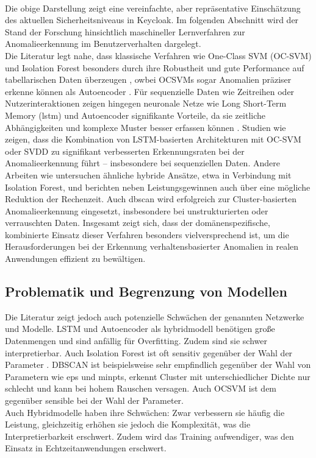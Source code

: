 \documentclass[a4paper,12pt]{article}
\let\footnote=\endnote
\begin{document}
	\\[0.5em]
	Die obige Darstellung zeigt eine vereinfachte, aber repräsentative Einschätzung des aktuellen Sicherheitsniveaus in Keycloak. Im folgenden Abschnitt wird der Stand der Forschung hinsichtlich maschineller Lernverfahren zur Anomalieerkennung im Benutzerverhalten dargelegt.
	\\[0.5em]
	Die Literatur legt nahe, dass klassische Verfahren wie One-Class SVM (OC-SVM) und Isolation Forest besonders durch ihre Robustheit und gute Performance auf tabellarischen Daten überzeugen \cite{pang2021deep}, owbei OCSVMs sogar Anomalien präziser erkenne können als Autoencoder \cite{arjunan2024}. Für sequenzielle Daten wie Zeitreihen oder Nutzerinteraktionen zeigen hingegen neuronale Netze wie Long Short-Term Memory (\gls{lstm}) und Autoencoder signifikante Vorteile, da sie zeitliche Abhängigkeiten und komplexe Muster besser erfassen können \cite{demir2024comparative}. Studien wie \cite{ergen2017unsupervised} zeigen, dass die Kombination von LSTM-basierten Architekturen mit OC-SVM oder SVDD \footnote{https://github.com/lukasruff/Deep-SVDD-PyTorch} zu signifikant verbesserten Erkennungsraten bei der Anomalieerkennung führt – insbesondere bei sequenziellen Daten. Andere Arbeiten wie \cite{ghrib2020hybrid} untersuchen ähnliche hybride Ansätze, etwa in Verbindung mit Isolation Forest, und berichten neben Leistungsgewinnen auch über eine mögliche Reduktion der Rechenzeit. Auch \gls{dbscan} wird erfolgreich zur Cluster-basierten Anomalieerkennung eingesetzt, insbesondere bei unstrukturierten oder verrauschten Daten. Insgesamt zeigt sich, dass der domänenspezifische, kombinierte Einsatz dieser Verfahren besonders vielversprechend ist, um die Herausforderungen bei der Erkennung verhaltensbasierter Anomalien in realen Anwendungen effizient zu bewältigen.
	
	\subsection{Problematik und Begrenzung von Modellen}
	Die Literatur zeigt jedoch auch potenzielle Schwächen der genannten Netzwerke und Modelle. LSTM und Autoencoder als \gls{hybridmodell} benötigen große Datenmengen und sind anfällig für Overfitting. Zudem sind sie schwer interpretierbar. Auch Isolation Forest ist oft sensitiv gegenüber der Wahl der Parameter \cite{chua2024web}. DBSCAN ist beispielsweise sehr empfindlich gegenüber der Wahl von Parametern wie \gls{eps} und \gls{minpts}, erkennt Cluster mit unterschiedlicher Dichte nur schlecht und kann bei hohem Rauschen versagen. Auch OCSVM ist dem gegenüber sensible bei der Wahl der Parameter.
	\\[0.5em]
	Auch Hybridmodelle haben ihre Schwächen: Zwar verbessern sie häufig die Leistung, gleichzeitig erhöhen sie jedoch die Komplexität, was die Interpretierbarkeit erschwert. Zudem wird das Training aufwendiger, was den Einsatz in Echtzeitanwendungen erschwert.
	
\end{document}
